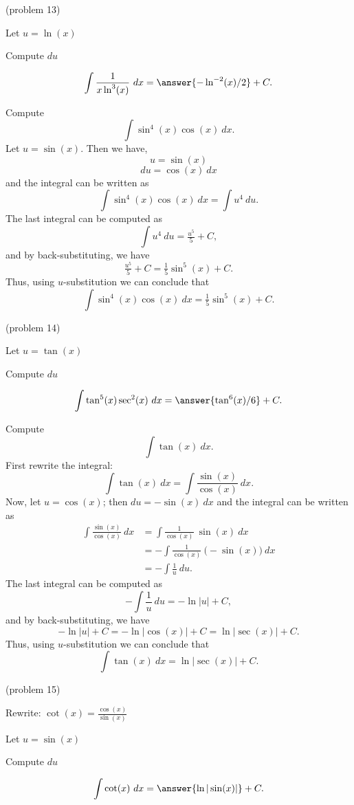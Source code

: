 \documentclass[handout]{ximera}
\begin{document}
\begin{problem}(problem 13)
\begin{hint}
Let $u = \ln(x)$
\end{hint}
\begin{hint}
Compute $du$
\end{hint}
\[\int \frac{1}{x\ln^3(x)} \ dx = \answer{- \ln^{-2}(x)/2} +C.\]
\end{problem}

\begin{example}[example 14] Compute 
\[\int \sin^4(x)\cos(x) \ dx.\]
Let $u = \sin(x)$. Then we have,
\[u = \sin(x)\]
\[du = \cos(x) \ dx\]
and the integral can be written as 
\[\int \sin^4(x)\cos(x) \ dx  = \int u^4 \ du.\]
The last integral can be computed as 
\[\int u^4 \ du = \tfrac{u^5}{5} + C,\]
and by back-substituting, we have 
\[\tfrac{u^5}{5} + C = \tfrac15 \sin^5(x) + C.\]
Thus, using $u$-substitution we can conclude that
\[\int \sin^4(x)\cos(x) \ dx =  \tfrac15 \sin^5(x) + C.\]
\end{example}



\begin{problem}(problem 14)
\begin{hint}
Let $u = \tan(x)$
\end{hint}
\begin{hint}
Compute $du$
\end{hint}
\[\int \tan^5(x)\sec^2(x) \ dx = \answer{\tan^6(x)/6} +C.\]
\end{problem}

\begin{example}[example 15] Compute 
\[\int \tan(x) \ dx.\]
First rewrite the integral:
\[\int \tan(x) \ dx =\int \frac{\sin(x)}{\cos(x)} \ dx.\]
Now, let $u = \cos(x)$; then $du = -\sin(x) \ dx$
and the integral can be written as
\begin{align*}
\int \frac{\sin(x)}{\cos(x)} \ dx &= \int \frac{1}{\cos(x)}\ \sin(x) \  dx \\
 &=  - \int \frac{1}{\cos(x)}\ \big(-\sin(x)\big) \  dx\\
&=-\int \frac{1}{u} \ du.
\end{align*}
The last integral can be computed as 
\[-\int \frac{1}{u} \ du = -\ln|u| + C,\]
and by back-substituting, we have 
\[-\ln|u| + C = -\ln|\cos(x)| + C = \ln|\sec(x)| +C.\]
Thus, using $u$-substitution we can conclude that
\[\int \tan(x) \ dx =  \ln|\sec(x)| + C.\]
\end{example}

\begin{problem}(problem 15)
\begin{hint}
Rewrite: $\cot(x) = \frac{\cos(x)}{\sin(x)}$
\end{hint}
\begin{hint}
Let $u = \sin(x)$
\end{hint}
\begin{hint}
Compute $du$
\end{hint}
\[\int \cot(x) \ dx = \answer{\ln|\sin(x)|} +C.\]


\end{problem}
\end{document}
